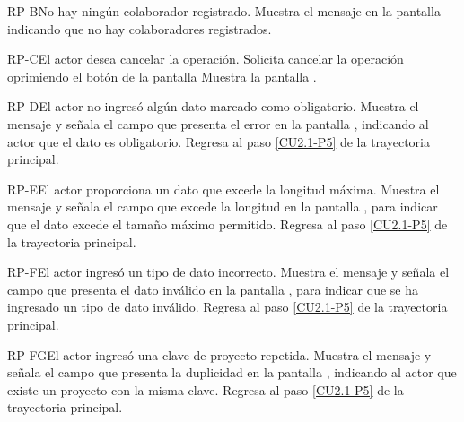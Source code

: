 
		\begin{UCtrayectoriaA}{RP-B}{No hay ningún colaborador registrado.}
	\UCpaso[\UCsist] Muestra el mensaje  en la pantalla  indicando que no hay colaboradores registrados.
		\end{UCtrayectoriaA}
	
	\begin{UCtrayectoriaA}{RP-C}{El actor desea cancelar la operación.}
		\UCpaso[\UCactor] Solicita cancelar la operación oprimiendo el botón  de la pantalla 
		\UCpaso[\UCsist] Muestra la pantalla .
	\end{UCtrayectoriaA}

	\begin{UCtrayectoriaA}{RP-D}{El actor no ingresó algún dato marcado como obligatorio.}
		\UCpaso[\UCsist] Muestra el mensaje  y señala el campo que presenta el error en la pantalla , indicando al actor que el dato es obligatorio.
		\UCpaso Regresa al paso \ref{CU2.1-P5} de la trayectoria principal.
	\end{UCtrayectoriaA}

	\begin{UCtrayectoriaA}{RP-E}{El actor proporciona un dato que excede la longitud máxima.}
		\UCpaso[\UCsist] Muestra el mensaje  y señala el campo que excede la longitud en la pantalla , para indicar que el dato excede el tamaño máximo permitido.
		\UCpaso Regresa al paso \ref{CU2.1-P5} de la trayectoria principal.
	\end{UCtrayectoriaA}

	\begin{UCtrayectoriaA}{RP-F}{El actor ingresó un tipo de dato incorrecto.}
		\UCpaso[\UCsist] Muestra el mensaje  y señala el campo que presenta el dato inválido en la pantalla , para indicar que se ha ingresado un tipo de dato inválido.
		\UCpaso Regresa al paso \ref{CU2.1-P5} de la trayectoria principal.
	\end{UCtrayectoriaA}

	\begin{UCtrayectoriaA}{RP-FG}{El actor ingresó una clave de proyecto repetida.}
		\UCpaso[\UCsist] Muestra el mensaje  y señala el campo que presenta la duplicidad en la pantalla , indicando al actor que existe un proyecto con la misma clave.
		\UCpaso Regresa al paso \ref{CU2.1-P5} de la trayectoria principal.
	\end{UCtrayectoriaA}
	
